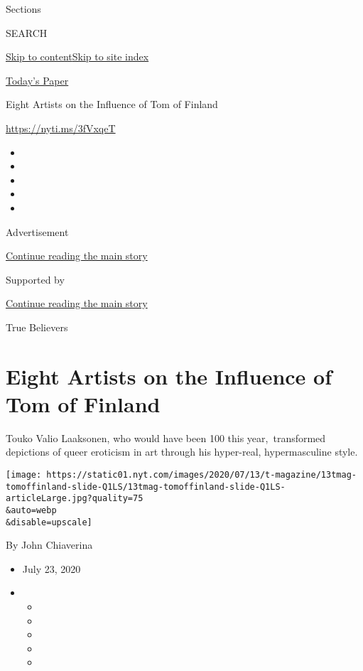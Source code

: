 Sections

SEARCH

\protect\hyperlink{site-content}{Skip to
content}\protect\hyperlink{site-index}{Skip to site index}

\href{https://myaccount.nytimes.com/auth/login?response_type=cookie\&client_id=vi}{}

\href{https://www.nytimes.com/section/todayspaper}{Today's Paper}

Eight Artists on the Influence of Tom of Finland

\url{https://nyti.ms/3fVxqeT}

\begin{itemize}
\item
\item
\item
\item
\item
\end{itemize}

Advertisement

\protect\hyperlink{after-top}{Continue reading the main story}

Supported by

\protect\hyperlink{after-sponsor}{Continue reading the main story}

True Believers

\hypertarget{eight-artists-on-the-influence-of-tom-of-finland}{%
\section{Eight Artists on the Influence of Tom of
Finland}\label{eight-artists-on-the-influence-of-tom-of-finland}}

Touko Valio Laaksonen, who would have been 100 this year,~transformed
depictions of queer eroticism in art through his hyper-real,
hypermasculine style.

\texttt{[image: https://static01.nyt.com/images/2020/07/13/t-magazine/13tmag-tomoffinland-slide-Q1LS/13tmag-tomoffinland-slide-Q1LS-articleLarge.jpg?quality=75\\\&auto=webp\\\&disable=upscale]}

By John Chiaverina

\begin{itemize}
\item
  July 23, 2020
\item
  \begin{itemize}
  \item
  \item
  \item
  \item
  \item
  \end{itemize}
\end{itemize}

